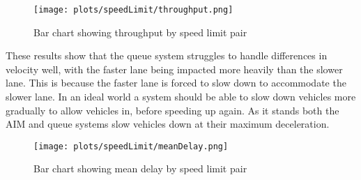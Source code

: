 \begin{figure}[htb]
\texttt{[image: plots/speedLimit/throughput.png]}
\caption{Bar chart showing throughput by speed limit pair}
\label{fig:throughputSpeedLimit}
\end{figure}

These results show that the queue system struggles to handle differences in velocity well, with the faster lane being impacted more heavily than the slower lane. This is because the faster lane is forced to slow down to accommodate the slower lane. In an ideal world a system should be able to slow down vehicles more gradually to allow vehicles in, before speeding up again. As it stands both the AIM and queue systems slow vehicles down at their maximum deceleration.

\begin{figure}[p]
\centerline{
	\texttt{[image: plots/speedLimit/meanDelay.png]}
}
\caption{Bar chart showing mean delay by speed limit pair}
\label{fig:meanDelaySpeedLimit}
\end{figure}

